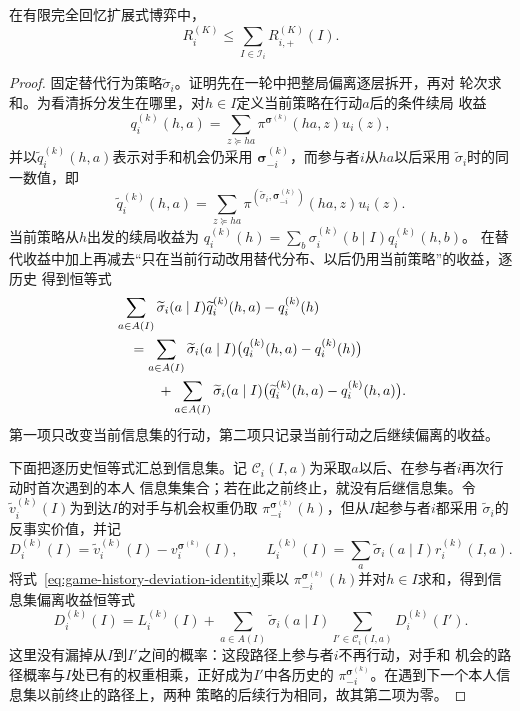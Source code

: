 \begin{theorem}[CFR的反事实遗憾分解]
\label{thm:game-cfr-decomposition}
在有限完全回忆扩展式博弈中，
\begin{equation}
  R_i^{(K)}
  \leq
  \sum_{I\in\mathcal{I}_i}
  R_{i,+}^{(K)}(I).
  \label{eq:game-cfr-global-bound}
\end{equation}
\end{theorem}

\begin{proof}
固定替代行为策略\(\widetilde{\sigma}_i\)。证明先在一轮中把整局偏离逐层拆开，再对
轮次求和。为看清拆分发生在哪里，对\(h\in I\)定义当前策略在行动\(a\)后的条件续局
收益
\[
  q_i^{(k)}(h,a)
  =
  \sum_{z\succeq ha}
  \pi^{\bm{\sigma}^{(k)}}(ha,z)u_i(z),
\]
并以\(\widetilde q_i^{(k)}(h,a)\)表示对手和机会仍采用
\(\bm{\sigma}_{-i}^{(k)}\)，而参与者\(i\)从\(ha\)以后采用
\(\widetilde{\sigma}_i\)时的同一数值，即
\[
  \widetilde q_i^{(k)}(h,a)
  =
  \sum_{z\succeq ha}
  \pi^{(\widetilde{\sigma}_i,\bm{\sigma}_{-i}^{(k)})}(ha,z)
  u_i(z).
\]
当前策略从\(h\)出发的续局收益为
\(q_i^{(k)}(h)=\sum_b\sigma_i^{(k)}(b\mid I)q_i^{(k)}(h,b)\)。
在替代收益中加上再减去“只在当前行动改用替代分布、以后仍用当前策略”的收益，逐历史
得到恒等式
\begin{align}
  &\sum_{a\in A(I)}
  \widetilde{\sigma}_i(a\mid I)
  \widetilde q_i^{(k)}(h,a)
  -
  q_i^{(k)}(h)
  \notag\\
  &\quad=
  \sum_{a\in A(I)}
  \widetilde{\sigma}_i(a\mid I)
  \bigl(q_i^{(k)}(h,a)-q_i^{(k)}(h)\bigr)
  \notag\\
  &\qquad\quad+
  \sum_{a\in A(I)}
  \widetilde{\sigma}_i(a\mid I)
  \bigl(
    \widetilde q_i^{(k)}(h,a)-q_i^{(k)}(h,a)
  \bigr).
  \label{eq:game-history-deviation-identity}
\end{align}
第一项只改变当前信息集的行动，第二项只记录当前行动之后继续偏离的收益。

下面把逐历史恒等式汇总到信息集。记
\(\mathcal{C}_i(I,a)\)为采取\(a\)以后、在参与者\(i\)再次行动时首次遇到的本人
信息集集合；若在此之前终止，就没有后继信息集。令
\(\widetilde v_i^{(k)}(I)\)为到达\(I\)的对手与机会权重仍取
\(\pi_{-i}^{\bm{\sigma}^{(k)}}(h)\)，但从\(I\)起参与者\(i\)都采用
\(\widetilde{\sigma}_i\)的反事实价值，并记
\[
  D_i^{(k)}(I)
  =
  \widetilde v_i^{(k)}(I)
  -
  v_i^{\bm{\sigma}^{(k)}}(I),
  \qquad
  L_i^{(k)}(I)
  =
  \sum_a
  \widetilde{\sigma}_i(a\mid I)r_i^{(k)}(I,a).
\]
将式~\eqref{eq:game-history-deviation-identity}乘以
\(\pi_{-i}^{\bm{\sigma}^{(k)}}(h)\)并对\(h\in I\)求和，得到信息集偏离收益恒等式
\begin{equation}
  D_i^{(k)}(I)
  =
  L_i^{(k)}(I)
  +
  \sum_{a\in A(I)}
  \widetilde{\sigma}_i(a\mid I)
  \sum_{I'\in\mathcal{C}_i(I,a)}
  D_i^{(k)}(I').
  \label{eq:game-information-set-deviation-identity}
\end{equation}
这里没有漏掉从\(I\)到\(I'\)之间的概率：这段路径上参与者\(i\)不再行动，对手和
机会的路径概率与\(I\)处已有的权重相乘，正好成为\(I'\)中各历史的
\(\pi_{-i}^{\bm{\sigma}^{(k)}}\)。在遇到下一个本人信息集以前终止的路径上，两种
策略的后续行为相同，故其第二项为零。


\end{proof}
